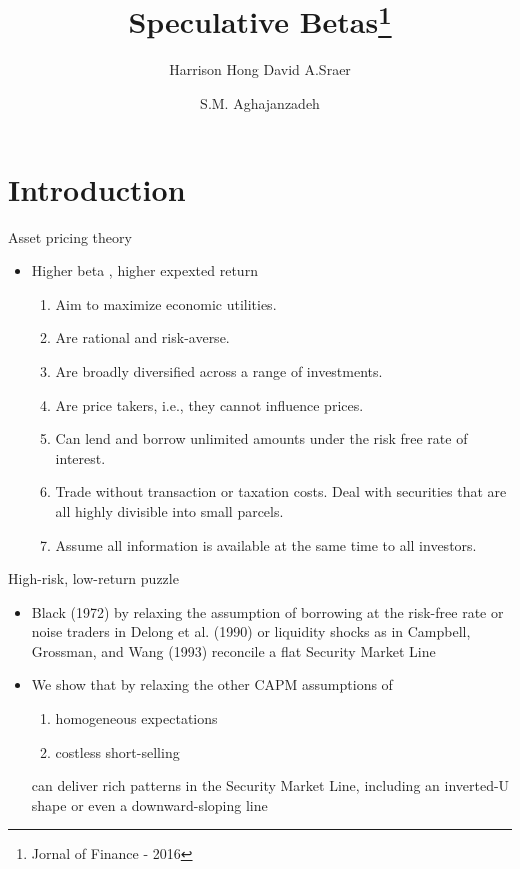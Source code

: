 \documentclass{beamer}
\title[Speculative Betas]{Speculative Betas\footnote{ \tiny Jornal of Finance - 2016}}
\subtitle{Harrison Hong \qquad David A.Sraer}
\author[Aghajanzadeh]{S.M. Aghajanzadeh  }
\institute[]{Tehran Institute for Advanced Studies }
\begin{document}
{\maketitle}
\small

\section{Introduction}

\begin{frame}{Asset pricing theory}
\begin{itemize}
\item Higher beta , higher expexted return
\begin{enumerate}
\footnotesize
\item Aim to maximize economic utilities.
\item Are rational and risk-averse.
\item Are broadly diversified across a range of investments.
\item Are price takers, i.e., they cannot influence prices.
\item Can lend and borrow unlimited amounts under the risk free rate of interest.
\item Trade without transaction or taxation costs.
Deal with securities that are all highly divisible into small parcels.
\item Assume all information is available at the same time to all investors.
\end{enumerate}

\end{itemize}
\end{frame}

\begin{frame}{High-risk, low-return puzzle}
\begin{itemize}
\item Black (1972)  by relaxing the assumption of borrowing at the risk-free rate or noise traders  in Delong et al. (1990) or liquidity shocks as in Campbell, Grossman, and Wang (1993)  reconcile a flat Security Market Line
\item   We show that by relaxing the other CAPM assumptions of
\begin{enumerate}
\item  homogeneous expectations
\item costless short-selling
\end{enumerate}  can deliver rich patterns in the Security Market Line, including an inverted-U shape or even a downward-sloping line
\end{itemize}
\end{frame}
\end{document}
